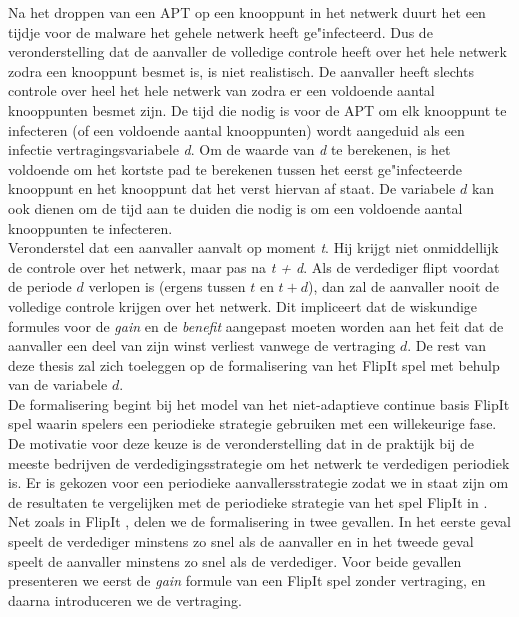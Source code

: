 \documentclass[master=cws, masteroption=vs,english]{kulemt}
\begin{document}
\begin{abstract*}
Na het droppen van een APT op een knooppunt in het netwerk duurt het een tijdje voor de malware het gehele netwerk heeft ge"infecteerd. Dus de veronderstelling dat de aanvaller de volledige controle heeft over het hele netwerk zodra een knooppunt besmet is, is niet realistisch. De aanvaller heeft slechts controle over heel het hele netwerk van zodra er een voldoende aantal knooppunten besmet zijn.
De tijd die nodig is voor de APT om elk knooppunt te infecteren (of een voldoende aantal knooppunten) wordt
aangeduid als een infectie vertragingsvariabele \textit{d}. Om de waarde van \textit{d} te berekenen, is het voldoende om het kortste pad te berekenen tussen het eerst ge"infecteerde knooppunt en het knooppunt dat het verst hiervan af staat. De variabele $ d $ kan ook dienen om de tijd aan te duiden die nodig is om een voldoende aantal knooppunten te infecteren.\\

Veronderstel dat een aanvaller aanvalt op moment \textit {t}. Hij krijgt niet onmiddellijk de controle over het netwerk, maar pas na \textit {t + d}. Als de verdediger flipt voordat de periode $d$ verlopen is (ergens tussen $t$ en $t+d$), dan zal de aanvaller nooit de volledige controle krijgen over het netwerk. Dit impliceert dat de wiskundige formules voor de \textit{gain} en de \textit{benefit} aangepast moeten worden aan het feit dat de aanvaller een deel van zijn winst verliest vanwege de vertraging $d$. De rest van deze thesis zal zich toeleggen op de formalisering van het FlipIt spel met behulp van de variabele $ d $. \\


De formalisering begint bij het model van het niet-adaptieve continue basis FlipIt spel waarin spelers een periodieke strategie gebruiken met een willekeurige fase. De motivatie voor deze keuze is de veronderstelling dat in de praktijk bij de meeste bedrijven de verdedigingsstrategie om het netwerk te verdedigen periodiek is. Er is gekozen voor een periodieke aanvallersstrategie zodat we in staat zijn om de resultaten te vergelijken met de periodieke strategie van het spel FlipIt in \citep{FlipIt}. \\%


Net zoals in FlipIt \citep{FlipIt}, delen we de formalisering in twee gevallen. In het eerste geval speelt de verdediger minstens zo snel als de aanvaller en in het tweede geval speelt de aanvaller minstens zo snel als de verdediger. Voor beide gevallen presenteren we eerst de \textit{gain} formule van een FlipIt spel zonder vertraging, en daarna introduceren we de vertraging. \\


\end{abstract*}
\end{document}
